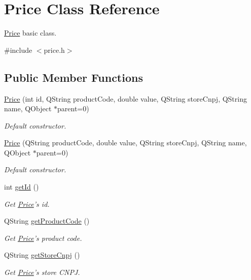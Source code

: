 \hypertarget{class_price}{\section{\-Price \-Class \-Reference}
\label{class_price}
}


\hyperlink{class_price}{\-Price} basic class.  




{\ttfamily \#include $<$price.\-h$>$}

\subsection*{\-Public \-Member \-Functions}
\begin{DoxyCompactItemize}
\item 
\hyperlink{class_price_acb3868e86d30d501efe4298cfcb592dc}{\-Price} (int id, \-Q\-String product\-Code, double value, \-Q\-String store\-Cnpj, \-Q\-String name, \-Q\-Object $\ast$parent=0)
\begin{DoxyCompactList}\small\item\em \-Default constructor. \end{DoxyCompactList}\item 
\hyperlink{class_price_aa0ffcaf206bca700c62e9045f04b3644}{\-Price} (\-Q\-String product\-Code, double value, \-Q\-String store\-Cnpj, \-Q\-String name, \-Q\-Object $\ast$parent=0)
\begin{DoxyCompactList}\small\item\em \-Default constructor. \end{DoxyCompactList}\item 
int \hyperlink{class_price_a6d1a77d7cb054d6f8dd95b05f44afdb6}{get\-Id} ()
\begin{DoxyCompactList}\small\item\em \-Get \hyperlink{class_price}{\-Price}'s id. \end{DoxyCompactList}\item 
\-Q\-String \hyperlink{class_price_aa4de13a37f52b065686e3d3adff91494}{get\-Product\-Code} ()
\begin{DoxyCompactList}\small\item\em \-Get \hyperlink{class_price}{\-Price}'s product code. \end{DoxyCompactList}\item 
\-Q\-String \hyperlink{class_price_af3ddad62713536965c0d3286ca686af3}{get\-Store\-Cnpj} ()
\begin{DoxyCompactList}\small\item\em \-Get \hyperlink{class_price}{\-Price}'s store \-C\-N\-P\-J. \end{DoxyCompactList}\item 

\end{DoxyCompactItemize}
